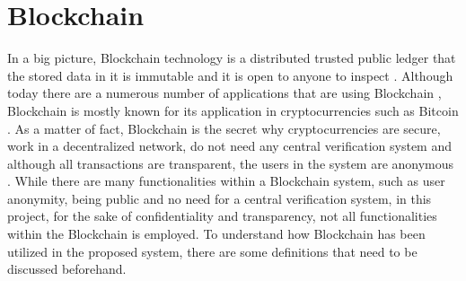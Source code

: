 \section{Blockchain}
In a big picture, Blockchain technology is a distributed trusted public ledger that the stored data in it is immutable and it is open to anyone to inspect \cite{OECD2016Science}. Although today there are a numerous number of applications that are using Blockchain \cite{dhillon2017blockchain},  ‌Blockchain is mostly known for its application in cryptocurrencies such as Bitcoin \cite{nakamoto2008bitcoin}. As a matter of fact, Blockchain is the secret why cryptocurrencies are secure, work in a decentralized network, do not need any central verification system and although all transactions are transparent, the users in the system are anonymous \cite{halaburda2016beyond}.
While there are many functionalities within a Blockchain system, such as user anonymity, being public and no need for a central verification system, in this project, for the sake of confidentiality and transparency, not all functionalities within the Blockchain is employed. To understand how Blockchain has been utilized in the proposed system, there are some definitions that need to be discussed beforehand.

